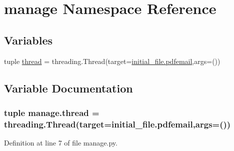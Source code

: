 \hypertarget{a00040}{}\section{manage Namespace Reference}
\label{a00040}
\subsection*{Variables}
\begin{DoxyCompactItemize}
\item 
tuple \hyperlink{a00040_ab0c13dd165a5c8a6f3e3c029a2acd921}{thread} = threading.\+Thread(target=\hyperlink{a00037_a105b1aa7bf4db853b6f4d064ed224030}{initial\+\_\+file.\+pdfemail},args=())
\end{DoxyCompactItemize}


\subsection{Variable Documentation}
\hypertarget{a00040_ab0c13dd165a5c8a6f3e3c029a2acd921}{}
\subsubsection[{thread}]{\setlength{\rightskip}{0pt plus 5cm}tuple manage.\+thread = threading.\+Thread(target={\bf initial\+\_\+file.\+pdfemail},args=())}\label{a00040_ab0c13dd165a5c8a6f3e3c029a2acd921}


Definition at line 7 of file manage.\+py.

